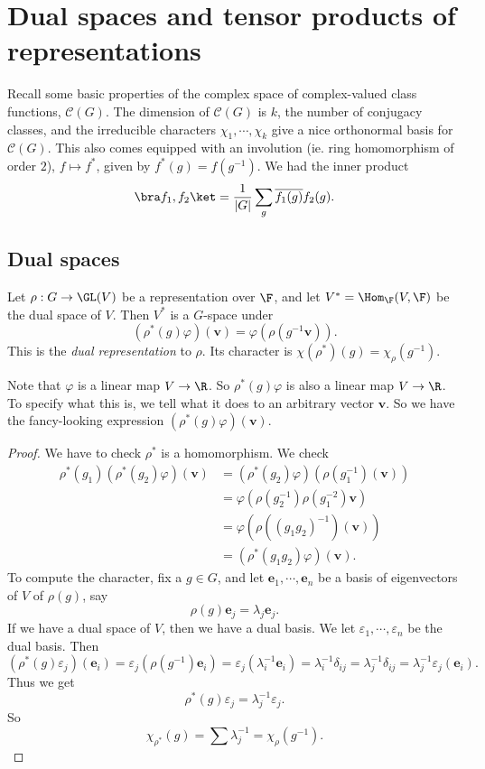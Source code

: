 \documentclass[a4paper]{article}
\begin{document}
\section{Dual spaces and tensor products of representations} %
Recall some basic properties of the complex space of complex-valued class functions, $\mathcal{C}(G)$. The dimension of $\mathcal{C}(G)$ is $k$, the number of conjugacy classes, and the irreducible characters $\chi_1, \cdots, \chi_k$ give a nice orthonormal basis for $\mathcal{C}(G)$. This also comes equipped with an involution (ie. ring homomorphism of order $2$), $f \mapsto f^*$, given by $f^*(g) = f(g^{-1})$. We had the inner product
\[
  \bra f_1, f_2\ket = \frac{1}{|G|} \sum_g \overline{f_1(g)} f_2(g).
\]
\subsection{Dual spaces}
\begin{lemma}
  Let $\rho: G \to \GL(V)$ be a representation over $\F$, and let $V^* = \Hom_\F (V, \F)$ be the dual space of $V$. Then $V^*$ is a $G$-space under
  \[
    (\rho^*(g) \varphi)(\mathbf{v}) = \varphi(\rho(g^{-1}\mathbf{v})).
  \]
  This is the \emph{dual representation} to $\rho$. Its character is $\chi(\rho^*)(g) = \chi_\rho(g^{-1})$.
\end{lemma}
Note that $\varphi$ is a linear map $V \to \R$. So $\rho^*(g) \varphi$ is also a linear map $V \to \R$. To specify what this is, we tell what it does to an arbitrary vector $\mathbf{v}$. So we have the fancy-looking expression $(\rho^*(g)\varphi)(\mathbf{v})$.

\begin{proof}
  We have to check $\rho^*$ is a homomorphism. We check
  \begin{align*}
    \rho^*(g_1)(\rho^*(g_2)\varphi)(\mathbf{v}) &= (\rho^*(g_2)\varphi)(\rho(g_1^{-1})(\mathbf{v}))\\
    &= \varphi(\rho(g_2^{-1})\rho(g_1^{-2}) \mathbf{v})\\
    &= \varphi(\rho((g_1g_2)^{-1})(\mathbf{v}))\\
    &= (\rho^*(g_1g_2) \varphi)(\mathbf{v}).
  \end{align*}
  To compute the character, fix a $g \in G$, and let $\mathbf{e}_1, \cdots, \mathbf{e}_n$ be a basis of eigenvectors of $V$ of $\rho(g)$, say
  \[
    \rho(g) \mathbf{e}_j = \lambda_j \mathbf{e}_j.
  \]
  If we have a dual space of $V$, then we have a dual basis. We let $\varepsilon_1,\cdots, \varepsilon_n$ be the dual basis. Then
  \[
    (\rho^*(g) \varepsilon_j)(\mathbf{e}_i) = \varepsilon_j(\rho(g^{-1}) \mathbf{e}_i) = \varepsilon_j (\lambda_i^{-1} \mathbf{e}_i) = \lambda_i^{-1} \delta_{ij} = \lambda_j^{-1} \delta_{ij} = \lambda_j^{-1} \varepsilon_j(\mathbf{e}_i).
  \]
  Thus we get
  \[
    \rho^*(g) \varepsilon_j = \lambda_j^{-1} \varepsilon_j.
  \]
  So
  \[
    \chi_{\rho^*}(g) = \sum \lambda_j^{-1} = \chi_\rho(g^{-1}).
  \]
\end{proof}
\end{document}
